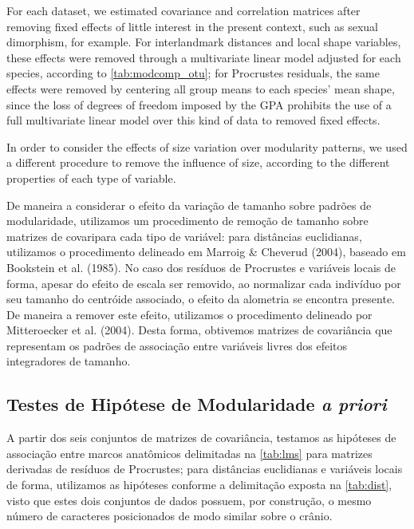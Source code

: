 \documentclass[11pt,]{article}
\begin{document}
For each dataset, we estimated covariance and correlation matrices after
removing fixed effects of little interest in the present context, such
as sexual dimorphism, for example. For interlandmark distances and local
shape variables, these effects were removed through a multivariate
linear model adjusted for each species, according to
\autoref{tab:modcomp_otu}; for Procrustes residuals, the same effects
were removed by centering all group means to each species' mean shape,
since the loss of degrees of freedom imposed by the GPA prohibits the
use of a full multivariate linear model over this kind of data to
removed fixed effects.

In order to consider the effects of size variation over modularity
patterns, we used a different procedure to remove the influence of size,
according to the different properties of each type of variable.

De maneira a considerar o efeito da variação de tamanho sobre padrões de
modularidade, utilizamos um procedimento de remoção de tamanho sobre
matrizes de covaripara cada tipo de variável: para distâncias
euclidianas, utilizamos o procedimento delineado em Marroig \& Cheverud
(2004), baseado em Bookstein et al. (1985). No caso dos resíduos de
Procrustes e variáveis locais de forma, apesar do efeito de escala ser
removido, ao normalizar cada indivíduo por seu tamanho do centróide
associado, o efeito da alometria se encontra presente. De maneira a
remover este efeito, utilizamos o procedimento delineado por
Mitteroecker et al. (2004). Desta forma, obtivemos matrizes de
covariância que representam os padrões de associação entre variáveis
livres dos efeitos integradores de tamanho.

\subsection{Testes de Hipótese de Modularidade \emph{a
priori}}\label{testes-de-hipotese-de-modularidade-a-priori}

A partir dos seis conjuntos de matrizes de covariância, testamos as
hipóteses de associação entre marcos anatômicos delimitadas na
\autoref{tab:lms} para matrizes derivadas de resíduos de Procrustes;
para distâncias euclidianas e variáveis locais de forma, utilizamos as
hipóteses conforme a delimitação exposta na \autoref{tab:dist}, visto
que estes dois conjuntos de dados possuem, por construção, o mesmo
número de caracteres posicionados de modo similar sobre o crânio.
\end{document}
